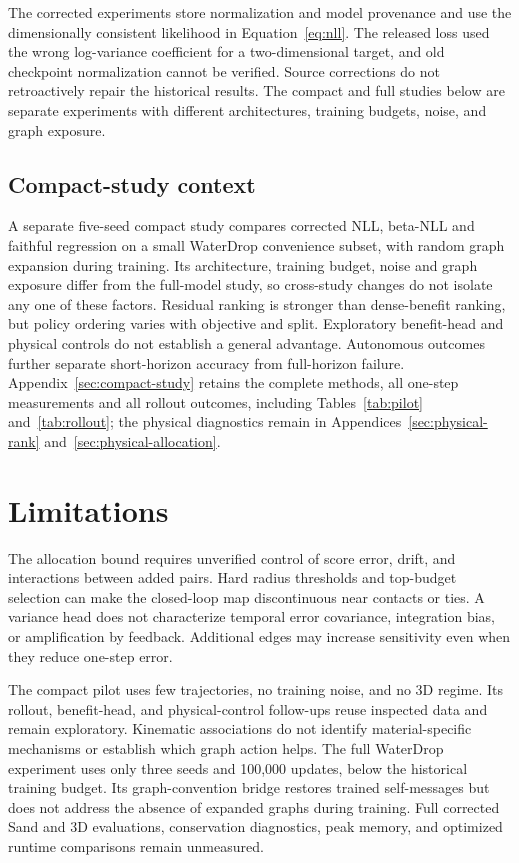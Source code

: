 The corrected experiments store normalization and model provenance and use the dimensionally consistent likelihood in Equation~\ref{eq:nll}. The released loss used the wrong log-variance coefficient for a two-dimensional target, and old checkpoint normalization cannot be verified. Source corrections do not retroactively repair the historical results. The compact and full studies below are separate experiments with different architectures, training budgets, noise, and graph exposure.





\subsection{Compact-study context}
A separate five-seed compact study compares corrected NLL, beta-NLL and
faithful regression on a small WaterDrop convenience subset, with random
graph expansion during training. Its architecture, training budget, noise
and graph exposure differ from the full-model study, so cross-study changes
do not isolate any one of these factors. Residual ranking is stronger than
dense-benefit ranking, but policy ordering varies with objective and split.
Exploratory benefit-head and physical controls do not establish a general
advantage. Autonomous outcomes further separate short-horizon accuracy from
full-horizon failure. Appendix~\ref{sec:compact-study} retains the complete
methods, all one-step measurements and all rollout outcomes, including
Tables~\ref{tab:pilot} and~\ref{tab:rollout}; the physical diagnostics remain
in Appendices~\ref{sec:physical-rank} and~\ref{sec:physical-allocation}.

\section{Limitations}
The allocation bound requires unverified control of score error, drift, and interactions between added pairs. Hard radius thresholds and top-budget selection can make the closed-loop map discontinuous near contacts or ties. A variance head does not characterize temporal error covariance, integration bias, or amplification by feedback. Additional edges may increase sensitivity even when they reduce one-step error.

The compact pilot uses few trajectories, no training noise, and no 3D regime. Its rollout, benefit-head, and physical-control follow-ups reuse inspected data and remain exploratory. Kinematic associations do not identify material-specific mechanisms or establish which graph action helps. The full WaterDrop experiment uses only three seeds and 100,000 updates, below the historical training budget. Its graph-convention bridge restores trained self-messages but does not address the absence of expanded graphs during training. Full corrected Sand and 3D evaluations, conservation diagnostics, peak memory, and optimized runtime comparisons remain unmeasured.


